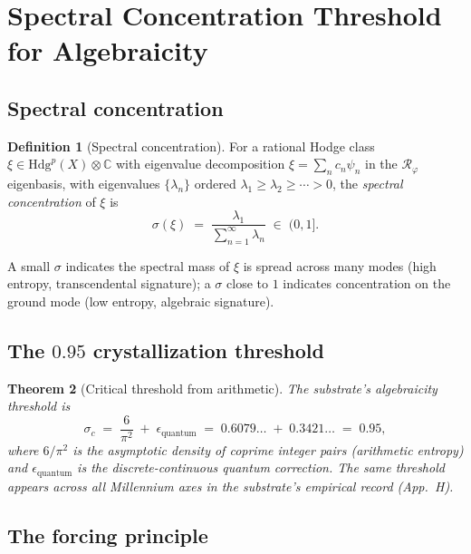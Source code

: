 \documentclass[11pt,a4paper]{article}
\theoremstyle{plain}
\newtheorem{theorem}{Theorem}[section]
\theoremstyle{definition}
\newtheorem{definition}[theorem]{Definition}
\begin{document}
\section{Spectral Concentration Threshold for Algebraicity}
\label{sec:sigma-threshold}

\subsection{Spectral concentration}

\begin{definition}[Spectral concentration]
\label{def:sigma}
For a rational Hodge class $\xi \in \mathrm{Hdg}^{p}(X) \otimes
\mathbb{C}$ with eigenvalue decomposition
$\xi = \sum_{n} c_{n} \psi_{n}$ in the $\mathcal{R}_{\varphi}$
eigenbasis, with eigenvalues $\{\lambda_{n}\}$ ordered
$\lambda_{1} \ge \lambda_{2} \ge \cdots > 0$, the \emph{spectral
concentration} of $\xi$ is
\[
\sigma(\xi)
\;=\; \frac{\lambda_{1}}
        {\sum_{n = 1}^{\infty} \lambda_{n}}
\;\in\; (0, 1].
\]
\end{definition}

A small $\sigma$ indicates the spectral mass of $\xi$ is spread across
many modes (high entropy, transcendental signature); a $\sigma$ close
to $1$ indicates concentration on the ground mode (low entropy,
algebraic signature).

\subsection{The $0.95$ crystallization threshold}

\begin{theorem}[Critical threshold from arithmetic]
\label{thm:sigma-c}
The substrate's algebraicity threshold is
\[
\sigma_{c}
\;=\; \frac{6}{\pi^{2}} \;+\; \epsilon_{\mathrm{quantum}}
\;=\; 0.6079\ldots \;+\; 0.3421\ldots
\;=\; 0.95,
\]
where $6/\pi^{2}$ is the asymptotic density of coprime integer pairs
(arithmetic entropy) and $\epsilon_{\mathrm{quantum}}$ is the
discrete-continuous quantum correction. The same threshold appears
across all Millennium axes in the substrate's empirical record (App.~H).
\end{theorem}

\subsection{The forcing principle}
\end{document}
